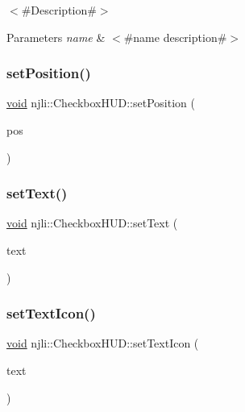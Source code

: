 $<$\#\+Description\#$>$


\begin{DoxyParams}{Parameters}
{\em name} & $<$\#name description\#$>$ \\
\hline
\end{DoxyParams}
\mbox{\label{classnjli_1_1_checkbox_h_u_d_aaa1068b0211ba419f36dfb3b10e726b3}} 
\subsubsection{\texorpdfstring{set\+Position()}{setPosition()}}
{\footnotesize\ttfamily \mbox{\hyperlink{_thread_8h_af1e856da2e658414cb2456cb6f7ebc66}{void}} njli\+::\+Checkbox\+H\+U\+D\+::set\+Position (\begin{DoxyParamCaption}\item[{const bt\+Vector2 \&}]{pos }\end{DoxyParamCaption})}

\mbox{\label{classnjli_1_1_checkbox_h_u_d_a186750a8e24a00f9473bb14c47248810}} 
\subsubsection{\texorpdfstring{set\+Text()}{setText()}}
{\footnotesize\ttfamily \mbox{\hyperlink{_thread_8h_af1e856da2e658414cb2456cb6f7ebc66}{void}} njli\+::\+Checkbox\+H\+U\+D\+::set\+Text (\begin{DoxyParamCaption}\item[{const char $\ast$}]{text }\end{DoxyParamCaption})}

\mbox{\label{classnjli_1_1_checkbox_h_u_d_ab1fe6f159b1937786b4c070c682220f9}} 
\subsubsection{\texorpdfstring{set\+Text\+Icon()}{setTextIcon()}}
{\footnotesize\ttfamily \mbox{\hyperlink{_thread_8h_af1e856da2e658414cb2456cb6f7ebc66}{void}} njli\+::\+Checkbox\+H\+U\+D\+::set\+Text\+Icon (\begin{DoxyParamCaption}\item[{const char $\ast$}]{text }\end{DoxyParamCaption})}

